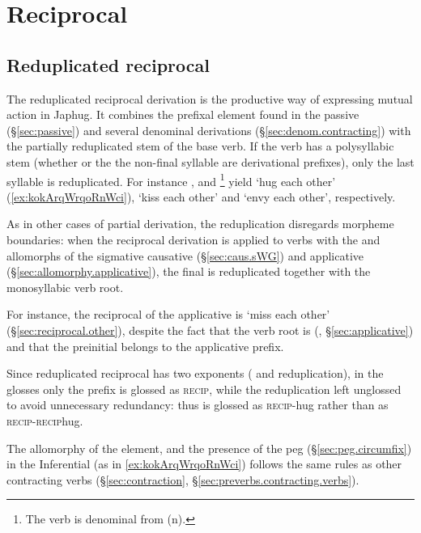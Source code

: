 \section{Reciprocal} \label{sec:reciprocal}

\subsection{Reduplicated reciprocal} \label{sec:redp.reciprocal}
The reduplicated reciprocal derivation is the productive way of expressing mutual action in Japhug. It combines the  prefixal element found in the passive (§\ref{sec:passive}) and several denominal derivations (§\ref{sec:denom.contracting}) with the partially reduplicated stem of the base verb. If the verb has a polysyllabic stem (whether or the the non-final syllable are derivational prefixes), only the last syllable is reduplicated. For instance ,   and \footnote{The verb  is denominal from  (n). } yield  `hug each other'  (\ref{ex:kokArqWrqoRnWci}),  `kiss each other' and  `envy each other', respectively. 

As in other cases of partial derivation, the reduplication disregards morpheme boundaries: when the reciprocal derivation is applied to verbs with the  and  allomorphs of the sigmative causative (§\ref{sec:caus.sWG}) and applicative (§\ref{sec:allomorphy.applicative}), the final  is reduplicated together with the monosyllabic verb root. 

For instance, the reciprocal of the applicative  is  `miss each other' (§\ref{sec:reciprocal.other}), despite the fact that the verb root is  (, §\ref{sec:applicative}) and that the preinitial  belongs to the applicative prefix. 

Since reduplicated reciprocal has two exponents ( and reduplication), in the glosses only the  prefix is glossed as \textsc{recip}, while the reduplication left unglossed to avoid unnecessary redundancy: thus  is glossed as \textsc{recip}-hug rather than as \textsc{recip}-\textsc{recip}\redp{}hug. 

The  allomorphy of the  element, and the presence of the peg  (§\ref{sec:peg.circumfix}) in the Inferential (as in \ref{ex:kokArqWrqoRnWci}) follows the same rules as other contracting verbs (§\ref{sec:contraction}, §\ref{sec:preverbs.contracting.verbs}).

